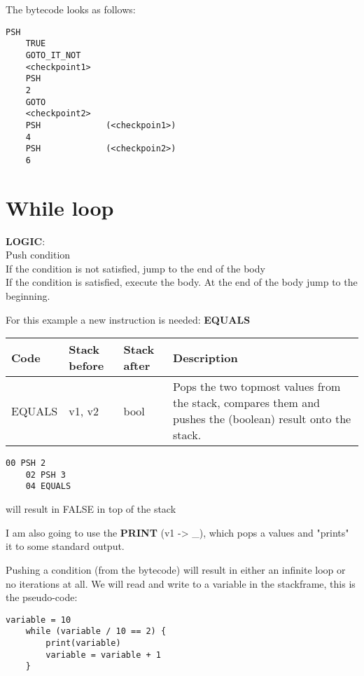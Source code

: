 \documentclass{article}
\begin{document}
The bytecode looks as follows:

\begin{lstlisting}[style=generic]
    PSH
    TRUE
    GOTO_IT_NOT
    <checkpoint1>
    PSH
    2
    GOTO
    <checkpoint2>
    PSH             (<checkpoin1>)
    4
    PSH             (<checkpoin2>)
    6
\end{lstlisting}

\pagebreak

\section{While loop}

\textbf{LOGIC}:
\\
Push condition
\\
If the condition is not satisfied, jump to the end of the body
\\
If the condition is satisfied, execute the body. At the end of the body jump to the beginning.

For this example a new instruction is needed: \textbf{EQUALS}

\bgroup{}
\def\arraystretch{1.25}
\begin{center}
    \begin{tabular}{ |l|l|l|p{7cm}| }
        \hline
        \textbf{Code} & \textbf{Stack before} & \textbf{Stack after} & \textbf{Description} \\
        \hline
        EQUALS & v1, v2 & bool & Pops the two topmost values from the stack, compares them and pushes the (boolean) result onto the stack.        \\
        \hline
    \end{tabular}
\end{center}
\egroup{}

\begin{lstlisting}[style=generic]
    00 PSH 2
    02 PSH 3
    04 EQUALS
\end{lstlisting}

will result in FALSE in top of the stack

I am also going to use the \textbf{PRINT} (v1 -> \_), which pops a values and "prints" it to some standard output.

Pushing a condition (from the bytecode) will result in either an infinite loop or no iterations at all.
We will read and write to a variable in the stackframe, this is the pseudo-code:

\begin{lstlisting}[style=generic]
    variable = 10
    while (variable / 10 == 2) {
        print(variable)
        variable = variable + 1
    }
\end{lstlisting}
\end{document}
